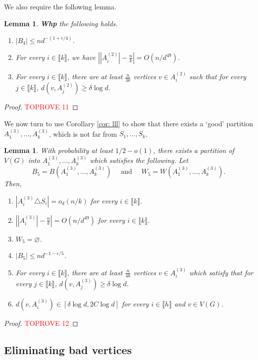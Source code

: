 \documentclass[notitlepage]{scrartcl}
\newcommand{\br}[1]{\llbracket{#1}\rrbracket}
\newtheorem{lemma}[thm]{Lemma}
\begin{document}
We also require the following lemma.
\begin{lemma}\label{l: typical tilde a}
\textbf{Whp} the following holds.
    \begin{enumerate}
        \item $|B_4| \le n d^{-(1 + \epsilon/4)}$.
        \item For every $i\in \br{k}$, we have $\left||A_{i}^{(2)}|-\frac{n}{k}\right|=O(n/d^{49})$.
        \item For every $i\in \br{k}$, there are at least $\frac{n}{3k}$ vertices $v\in A_i^{(2)}$ such that for every $j\in \br{k}$, $d(v,A_j^{(2)})\ge \delta\log d$.  
    \end{enumerate}
\end{lemma}
\begin{proof}\textcolor{red}{TOPROVE 11}\end{proof}

We now turn to use Corollary \ref{cor: lll} to show that there exists a `good' partition $A_1^{(3)},\ldots, A_k^{(3)}$, which is not far from $S_1,\ldots, S_k$.
\begin{lemma}\label{l: third lll}
With probability at least $1/2-o(1)$, there exists a partition of $V(G)$ into $A_1^{(3)},\ldots, A_k^{(3)}$ which satisfies the following. Let 
$$
B_5=B\left(A_1^{(3)},\ldots, A_k^{(3)}\right)
\quad\text{ and }\quad
W_5=W\left(A_1^{(3)},\ldots, A_k^{(3)}\right).
$$
Then,
\begin{enumerate}
    \item $\left|A_i^{(3)}\triangle S_i\right|=o_d(n/k)$ for every $i\in \br{k}$.\label{l: item third lll}
    \item $\left||A_i^{(3)}|-\frac{n}{k}\right|=O(n/d^{49})$ for every $i\in \br{k}$.
    \item $W_5=\varnothing$.
    \item $|B_5|\le nd^{-1-\epsilon/5}$.
    \item For every $i\in \br{k}$, there are at least $\frac{n}{4k}$ vertices $v \in A_i^{(3)}$ which satisfy that for every $j\in \br{k}$, $d(v,A_j^{(3)})\ge \delta\log d$. 
    \item $d(v, A_i^{(3)})\in \left[\delta \log d, 2C\log d\right]$ for every $i\in \br{h}$ and $v\in V(G)$.
\end{enumerate}
\end{lemma}
\begin{proof}\textcolor{red}{TOPROVE 12}\end{proof}

\subsection{Eliminating bad vertices}\label{s: bad vertices}
\end{document}
